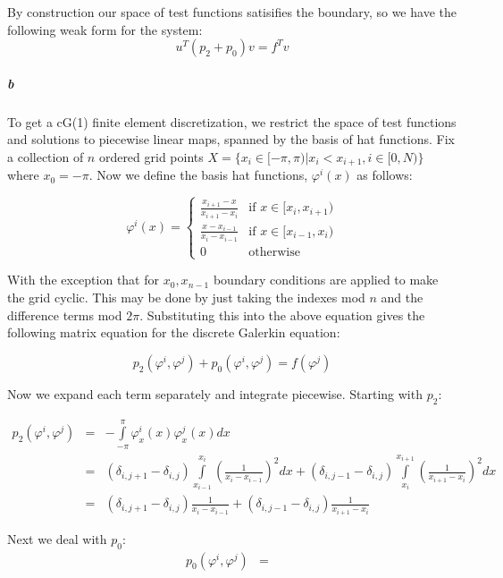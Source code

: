 \documentclass{article}
\begin{document}
By construction our space of test functions satisifies the boundary, so we have the following weak form for the system:
\[ u^T (p_2 + p_0) v = f^T v \]

\subparagraph{b}

To get a cG(1) finite element discretization, we restrict the space of test functions and solutions to piecewise linear maps, spanned by the basis of hat functions.  Fix a collection of $n$ ordered grid points $X = \{ x_i \in [-\pi, \pi) | x_i < x_{i+1}, i \in [0,N) \}$ where $x_0 = -\pi$.  Now we define the basis hat functions, $\varphi^i(x)$ as follows:

\[ \varphi^i(x) = \left \{ \begin{array}{cc}
\frac{x_{i+1} - x}{x_{i+1} - x_{i}} & \textrm{if } x \in [x_{i},   x_{i+1}) \\
\frac{x - x_{i-1}}{x_{i} - x_{i-1}} & \textrm{if } x \in [x_{i-1}, x_{i})   \\
0 & \textrm{otherwise}
\end{array} \right. \]

With the exception that for $x_0, x_{n-1}$ boundary conditions are applied to make the grid cyclic.  This may be done by just taking the indexes mod $n$ and the difference terms mod $2 \pi$.  Substituting this into the above equation gives the following matrix equation for the discrete Galerkin equation:

\[ p_2(\varphi^i, \varphi^j) + p_0(\varphi^i, \varphi^j) = f(\varphi^j) \]

Now we expand each term separately and integrate piecewise.  Starting with $p_2$:

\begin{eqnarray*}
p_2(\varphi^i, \varphi^j) & = & - \int \limits_{-\pi}^{\pi} \varphi^i_x(x) \varphi^j_x(x) dx \\
& = & \left( \delta_{i,j+1} - \delta_{i,j} \right) \int \limits_{x_{i-1}}^{x_{i}} \left( \frac{1}{x_{i} - x_{i-1}} \right)^2 dx 
+ \left( \delta_{i,j-1} - \delta_{i,j} \right) \int \limits_{x_{i}}^{x_{i+1}}  \left( \frac{1}{x_{i+1} - x_{i}} \right)^2 dx \\
& = & \left( \delta_{i,j+1} - \delta_{i,j} \right) \frac{1}{x_{i} - x_{i-1}} 
+ \left( \delta_{i,j-1} - \delta_{i,j} \right) \frac{1}{x_{i+1} - x_{i}}
\end{eqnarray*}

Next we deal with $p_0$:
\begin{eqnarray*}
p_0(\varphi^i, \varphi^j) & = & \\
\end{eqnarray*}
\end{document}
